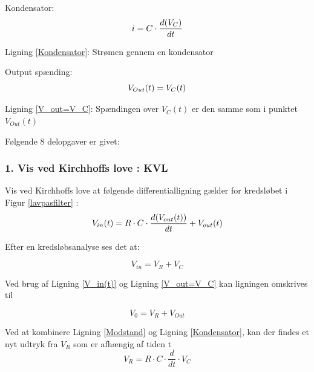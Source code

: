 Kondensator:
\begin{equation}
 i =C\cdot \frac{d(V_{C})}{dt}
\label{Kondensator}\\
\end{equation}
\begin{center}
Ligning \ref{Kondensator}: Strømen gennem en kondensator
\end{center}

Output spænding:
\begin{equation}
V_{Out}(t) = V_{C}(t)
\label{V_out=V_C}\\
\end{equation}
\begin{center}
Ligning \ref{V_out=V_C}: Spændingen over $V_ {C}(t)$ er den samme som i punktet $V_{Out}(t)$
\end{center}


\newpage

Følgende 8 delopgaver er givet:
\subsubsection*{1. Vis ved Kirchhoffs love : KVL}
Vis ved Kirchhoffs love at følgende differentialligning gælder for kredsløbet i Figur \ref{lavpasfilter} : 
\begin{equation}
V_{in}(t)= R \cdot C \cdot \frac{d(V_{out}(t))}{dt} + V_{out}(t)
\label{dfLigning}\\
\end{equation}

Efter en kredsløbsanalyse ses det at:
\begin{center}
\begin{equation}
V_{in}=V_{R}+V_{C}
\label{V_in:KVL}
\end{equation}
\end{center}
 
 Ved brug af Ligning \ref{V_in(t)} og Ligning \ref{V_out=V_C}  kan ligningen omskrives til 
 \begin{center}
\begin{equation}
V_{0}=V_{R}+V_{Out}
\label{V_0:KVL}
\end{equation}
\end{center}

Ved at kombinere Ligning \ref{Modstand} og Ligning \ref{Kondensator}, kan der findes et nyt udtryk fra $V_{R}$ som er afhængig af tiden t
\begin{equation}
	V_{R} = R\cdot C\cdot \dfrac{d}{dt}\cdot V_{C}
\end{equation}

